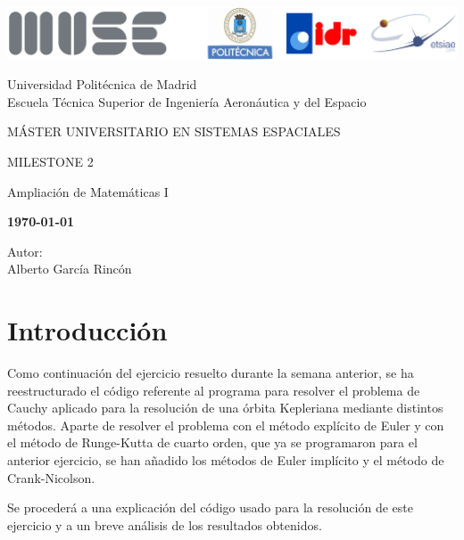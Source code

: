 \documentclass[12pt,a4paper]{article}
\begin{document}
	
\begin{titlepage}
	\centering
	\includegraphics[width=\textwidth]{FIGURES/Portada/Logo_portada.png} 
	\vspace{1.5cm}
	
	Universidad Politécnica de Madrid
	\\Escuela Técnica Superior de Ingeniería Aeronáutica y del Espacio
	\vspace{2cm}
	
	{\large MÁSTER UNIVERSITARIO EN SISTEMAS ESPACIALES}
	\vspace{2cm}
	
	{\LARGE MILESTONE 2}
	\vspace{1cm}
	
	{\large Ampliación de Matemáticas I}
	\vspace{4cm}
	
	\begin{center}
		\large{\textbf{\today}} \\
	\end{center}
	
	Autor: \\ Alberto García Rincón
	\vfill
\end{titlepage}

\newpage
\pagestyle{empty}
\tableofcontents	

\newpage
{}
\setcounter{page}{1}
\pagestyle{fancy} 

\section{Introducción}
Como continuación del ejercicio resuelto durante la semana anterior, se ha reestructurado el código referente al programa para resolver el problema de Cauchy aplicado para la resolución de una órbita Kepleriana mediante distintos métodos. Aparte de resolver el problema con el método explícito de Euler y con el método de Runge-Kutta de cuarto orden, que ya se programaron para el anterior ejercicio, se han añadido los métodos de Euler implícito y el método de Crank-Nicolson.

Se procederá a una explicación del código usado para la resolución de este ejercicio y a un breve análisis de los resultados obtenidos.
\end{document}
